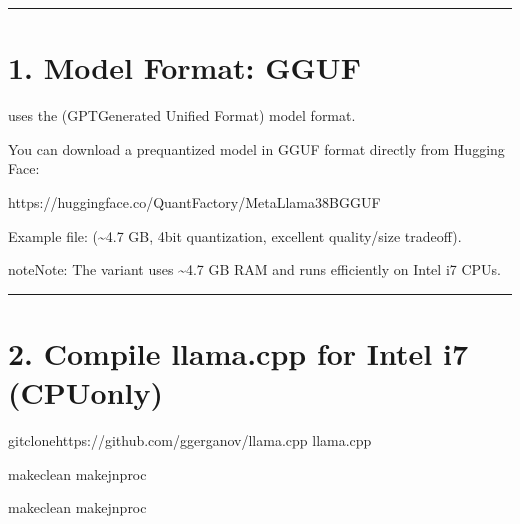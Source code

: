 \documentclass[letterpaper,10pt,english]{sphinxmanual}
\begin{document}
\bigskip\hrule\bigskip



\section{1. Model Format: GGUF}
\label{\detokenize{llama-cpp:model-format-gguf}}\label{\detokenize{llama-cpp:llama-cpp-compile-llama-cpp-for-intel-i7-cpu-only}}
\sphinxAtStartPar
{} uses the  (GPT\sphinxhyphen{}Generated Unified Format) model format.

\sphinxAtStartPar
You can download a pre\sphinxhyphen{}quantized  model in GGUF format directly from Hugging Face:

\begin{sphinxVerbatim}[commandchars=\\\{\}]
https://huggingface.co/QuantFactory/Meta\PYGZhy{}Llama\PYGZhy{}3\PYGZhy{}8B\PYGZhy{}GGUF
\end{sphinxVerbatim}

\sphinxAtStartPar
Example file:  (\textasciitilde{}4.7 GB, 4\sphinxhyphen{}bit quantization, excellent quality/size tradeoff).

\begin{sphinxadmonition}{note}{Note:}
\sphinxAtStartPar
The  variant uses \textasciitilde{}4.7 GB RAM and runs efficiently on Intel i7 CPUs.
\end{sphinxadmonition}


\bigskip\hrule\bigskip



\section{2. Compile llama.cpp for Intel i7 (CPU\sphinxhyphen{}only)}
\label{\detokenize{llama-cpp:compile-llama-cpp-for-intel-i7-cpu-only}}
\begin{sphinxVerbatim}[commandchars=\\\{\}]
gitclonehttps://github.com/ggerganov/llama.cpp
llama.cpp

makeclean
make\PYGZhy{}jnproc

makeclean
make\PYGZhy{}jnproc
\end{sphinxVerbatim}
\end{document}

